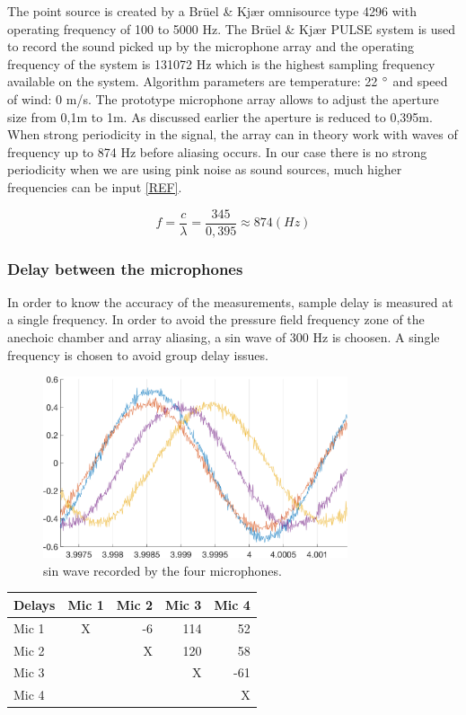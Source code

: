 The point source is created by a Brüel \& Kjær omnisource type 4296 with operating frequency of 100 to 5000 Hz. The Brüel \& Kjær PULSE system is used to record the sound picked up by the microphone array and the operating frequency of the system is 131072 Hz which is the highest sampling frequency available on the system. Algorithm parameters are temperature: 22 $\degree$ and speed of wind: 0 m/s. The prototype microphone array allows to adjust the aperture size from 0,1m to 1m. As discussed earlier the aperture is reduced to 0,395m. When strong periodicity in the signal, the array can in theory work with waves of frequency up to 874 Hz before aliasing occurs. In our case there is no strong periodicity when we are using pink noise as sound sources, much higher frequencies can be input \ref{REF}.

\begin{equation}
    f=\frac{c}{\lambda}=\frac{345}{0,395} \approx 874 (Hz)
\end{equation}

 
\subsubsection{Delay between the microphones}
 
 In order to know the accuracy of the measurements, sample delay is measured at a single frequency. In order to avoid the pressure field frequency zone of the anechoic chamber and array aliasing,  a sin wave of 300 Hz is choosen. A single frequency is chosen to avoid group delay issues.  
 
 \begin{figure}[H]
    \centering
    \includegraphics[width=0.8\textwidth]{Figures/delaytetra300Hz.png}
    \caption{sin wave recorded by the four microphones.}
    \label{fig:pinknoise}
\end{figure}
 
 
\begin{center}
  \begin{tabular}{ | l | c | r | r | r |}
    \hline
    Delays & Mic 1 & Mic 2 & Mic 3 & Mic 4 \\ \hline
    Mic 1 & X & -6&114 & 52  \\ \hline
    Mic 2 &   & X &120 & 58  \\ \hline
    Mic 3 &   &   & X  &-61  \\ \hline
    Mic 4 &   &   &    & X   \\ \hline
  \end{tabular}
\end{center}

